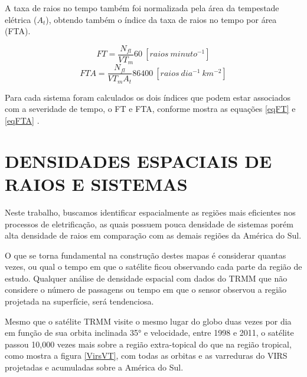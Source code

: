 

A taxa de raios no tempo também foi normalizada pela área da tempestade elétrica ($A_t$), obtendo também o índice da taxa de raios no tempo por área (FTA). 

\begin{equation}
FT = \frac{N_{fl} }{VT_m} 60 ~[raios~minuto^{-1}]  
\label{eqFT}  
\end{equation}
\begin{equation}
FTA = \frac{N_{fl} }{VT_m A_t } 86400 ~[raios~dia^{-1}~km^{-2}]
\label{eqFTA}
\end{equation}

Para cada sistema foram calculados os dois índices que podem estar associados com a severidade de tempo, o FT e FTA, conforme mostra as equações \ref{eqFT} e \ref{eqFTA} 
 .

\section{DENSIDADES ESPACIAIS DE RAIOS E SISTEMAS}

Neste trabalho, buscamos identificar espacialmente as regiões mais eficientes nos processos de eletrificação, as quais possuem pouca densidade de sistemas porém alta densidade de raios em comparação com as demais regiões da América do Sul.

O que se torna fundamental na construção destes mapas é considerar quantas vezes, ou qual o tempo em que o satélite ficou observando cada parte da região de estudo. Qualquer análise de densidade espacial com dados do TRMM que não considere o número de passagens ou tempo em que o sensor observou a região projetada na superfície, será tendenciosa.

Mesmo que o satélite TRMM visite o mesmo lugar do globo duas vezes por dia em função de sua orbita inclinada 35° e velocidade, entre 1998 e 2011, o satélite passou 10,000 vezes mais sobre a região extra-topical do que na região tropical, como mostra a figura \ref{VirsVT}, com todas as orbitas e as varreduras do VIRS projetadas e acumuladas sobre a América do Sul. 

